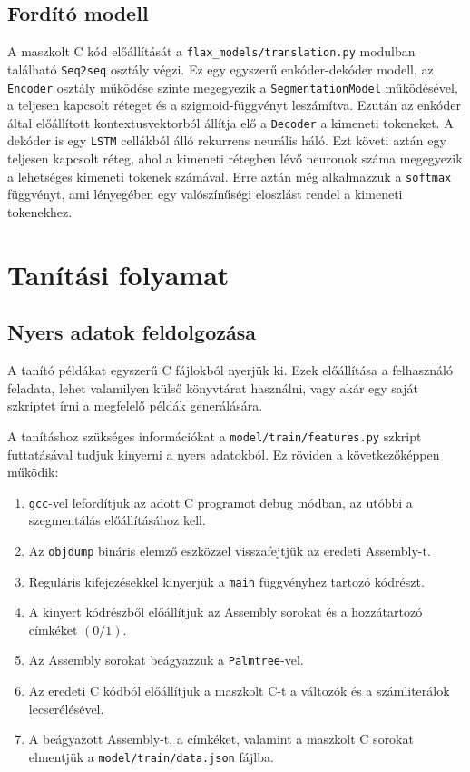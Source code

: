 \subsection{Fordító modell}
A maszkolt C kód előállítását a \texttt{flax\_models/translation.py} modulban található \texttt{Seq2seq}
osztály végzi. Ez egy egyszerű enkóder-dekóder modell, az \texttt{Encoder} osztály működése szinte megegyezik
a \texttt{SegmentationModel} működésével, a teljesen kapcsolt réteget és a szigmoid-függvényt leszámítva.
Ezután az enkóder által előállított kontextusvektorból állítja elő a \texttt{Decoder} a kimeneti tokeneket.
A dekóder is egy \texttt{LSTM} cellákból álló rekurrens neurális háló. Ezt követi aztán egy teljesen kapcsolt réteg,
ahol a kimeneti rétegben lévő neuronok száma megegyezik a lehetséges kimeneti tokenek számával. Erre aztán
még alkalmazzuk a \texttt{softmax} függvényt, ami lényegében egy valószínűségi eloszlást rendel a kimeneti
tokenekhez.

\section{Tanítási folyamat}

\subsection{Nyers adatok feldolgozása}
    A tanító példákat egyszerű C fájlokból nyerjük ki. Ezek előállítása a felhasználó feladata,
    lehet valamilyen külső könyvtárat használni, vagy akár egy saját szkriptet írni a megfelelő
    példák generálására.

    A tanításhoz szükséges információkat a \texttt{model/train/features.py} szkript futtatásával
    tudjuk kinyerni a nyers adatokból. Ez röviden a következőképpen működik:
    \begin{enumerate}
        \item \texttt{gcc}-vel\cite{gcc} lefordítjuk az adott C programot debug módban, az utóbbi
            a szegmentálás előállításához kell.
        \item Az \texttt{objdump}\cite{binutils} bináris elemző eszközzel visszafejtjük az eredeti Assembly-t.
        \item Reguláris kifejezésekkel kinyerjük a \texttt{main} függvényhez tartozó kódrészt.
        \item A kinyert kódrészből előállítjuk az Assembly sorokat és a hozzátartozó címkéket $(0 / 1)$.
        \item Az Assembly sorokat beágyazzuk a \texttt{Palmtree}-vel.
        \item Az eredeti C kódból előállítjuk a maszkolt C-t a változók és a számliterálok lecserélésével.
        \item A beágyazott Assembly-t, a címkéket, valamint a maszkolt C sorokat elmentjük a
            \texttt{model/train/data.json} fájlba.
    \end{enumerate}


